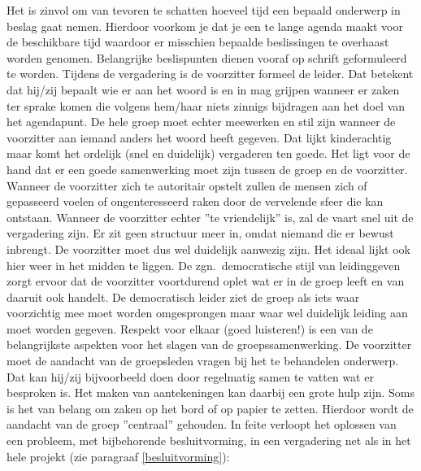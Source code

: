 Het is zinvol om van tevoren te schatten hoeveel tijd een
bepaald onderwerp in beslag gaat nemen. Hierdoor voorkom je
dat je een te lange agenda maakt voor de beschikbare tijd
waardoor er mis\-schien bepaalde beslissingen te overhaast
worden genomen. Belangrijke beslispunten dienen vooraf op
schrift geformuleerd te worden. 
Tijdens de vergadering is de voorzitter formeel de leider. Dat
betekent dat hij/zij bepaalt wie er aan het woord is en in mag
grijpen wanneer er zaken ter sprake komen die volgens hem/haar
niets zinnigs bijdragen aan het doel van het agendapunt. De
hele groep moet echter meewerken en stil zijn wanneer de
voorzitter aan iemand anders het woord heeft gegeven. Dat
lijkt kinderachtig maar komt het ordelijk (snel en duidelijk)
vergaderen ten goede.
Het ligt voor de hand dat er een goede samenwerking moet zijn
tussen de groep en de voorzitter. Wanneer de voorzitter zich
te autoritair opstelt zullen de mensen zich of gepasseerd
voelen of onge{\ii}nteresseerd raken door de vervelende sfeer die
kan ontstaan.
Wanneer de voorzitter echter ''te vriendelijk'' is, zal de vaart
snel uit de vergadering zijn. Er zit geen structuur meer in,
omdat niemand die er bewust inbrengt. De voorzitter moet dus
wel duidelijk aanwezig zijn.
Het ideaal lijkt ook hier weer in het midden te liggen. De
zgn.\ democratische stijl van leidinggeven zorgt ervoor dat de
voorzitter voortdurend oplet wat er in de groep leeft en van
daaruit ook handelt. De democratisch leider ziet de groep als
iets waar voorzichtig mee moet worden omgesprongen maar waar
wel duidelijk leiding aan moet worden gegeven. Respekt voor
elkaar (goed luisteren!) is een van de belangrijkste aspekten
voor het slagen van de groepssamenwerking.
De voorzitter moet de aandacht van de groepsleden vragen bij
het te behandelen onderwerp. Dat kan hij/zij bijvoorbeeld doen
door regelmatig samen te vatten wat er besproken is. Het 
maken van aantekeningen kan daarbij een grote hulp zijn. Soms
is het van belang om zaken op het bord of op papier te zetten.
Hierdoor wordt de aandacht van de groep ''centraal'' gehouden.
In feite verloopt het oplossen van een probleem, met bijbehorende besluitvorming, in een vergadering net als in het hele
projekt (zie paragraaf \ref{besluitvorming}):
